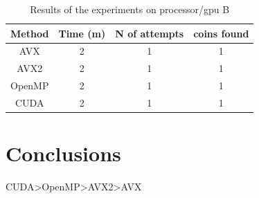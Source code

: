 \documentclass[a4paper,12pt]{article}
\begin{document}
\begin{table}[h]
    \centering
    \begin{tabular}{|c|c|c|c|}
        \hline
        \textbf{Method} & \textbf{Time (m)} & \textbf{N of attempts} & \textbf{coins found} \\
        \hline
        AVX & 2 & 1 & 1  \\
        AVX2 & 2 & 1 & 1 \\
        OpenMP & 2 & 1 & 1 \\
        CUDA & 2 & 1 & 1  \\
        \hline
    \end{tabular}
    \caption{Results of the experiments on processor/gpu B}
    \label{tab:results}
\end{table}



\section{Conclusions}
\label{sec:discussion}

CUDA\textgreater OpenMP\textgreater AVX2\textgreater AVX
\end{document}
